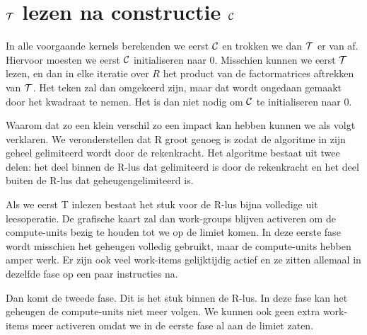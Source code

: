 \section{$\mathcal{T}$ lezen na constructie $\mathcal{C}$}
In alle voorgaande kernels berekenden we eerst $\mathcal{C}$ en trokken we dan $\mathcal{T}$ er van af. Hiervoor moesten we eerst $\mathcal{C}$ initialiseren naar 0. Misschien kunnen we eerst $\mathcal{T}$ lezen, en dan in elke iteratie over $R$ het product van de factormatrices aftrekken van $\mathcal{T}$. Het teken zal dan omgekeerd zijn, maar dat wordt ongedaan gemaakt door het kwadraat te nemen. Het is dan niet nodig om $\mathcal{C}$ te initialiseren naar 0.


Waarom dat zo een klein verschil zo een impact kan hebben kunnen we als volgt verklaren. We veronderstellen dat R groot genoeg is zodat de algoritme in zijn geheel gelimiteerd wordt door de rekenkracht. Het algoritme bestaat uit twee delen: het deel binnen de R-lus dat gelimiteerd is door de rekenkracht en het deel buiten de R-lus dat geheugengelimiteerd is.

Als we eerst T inlezen bestaat het stuk voor de R-lus bijna volledige uit leesoperatie. De grafische kaart zal dan work-groups blijven activeren om de compute-units bezig te houden tot we op de limiet komen. In deze eerste fase wordt misschien het geheugen volledig gebruikt, maar de compute-units hebben amper werk. Er zijn ook veel work-items gelijktijdig actief en ze zitten allemaal in dezelfde fase op een paar instructies na.

Dan komt de tweede fase. Dit is het stuk binnen de R-lus. In deze fase kan het geheugen de compute-units niet meer volgen. We kunnen ook geen extra work-items meer activeren omdat we in de eerste fase al aan de limiet zaten.
